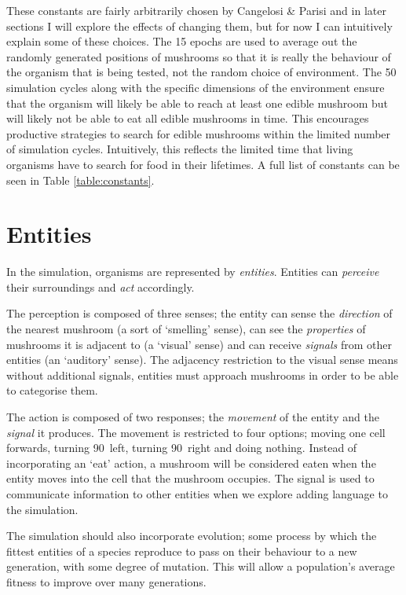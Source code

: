 \documentclass[12pt,a4paper,twoside,openright]{report}
\begin{document}
These constants are fairly arbitrarily chosen by Cangelosi \& Parisi and in later sections I will explore the effects of changing them, but for now I can intuitively explain some of these choices. The 15 epochs are used to average out the randomly generated positions of mushrooms so that it is really the behaviour of the organism that is being tested, not the random choice of environment. The 50 simulation cycles along with the specific dimensions of the environment ensure that the organism will likely be able to reach at least one edible mushroom but will likely not be able to eat all edible mushrooms in time. This encourages productive strategies to search for edible mushrooms within the limited number of simulation cycles. Intuitively, this reflects the limited time that living organisms have to search for food in their lifetimes. A full list of constants can be seen in Table \ref{table:constants}.

\section{Entities}\label{section:entities}

In the simulation, organisms are represented by \emph{entities}. Entities can \emph{perceive} their surroundings and \emph{act} accordingly.

The perception is composed of three senses; the entity can sense the \emph{direction} of the nearest mushroom (a sort of `smelling' sense), can see the \emph{properties} of mushrooms it is adjacent to (a `visual' sense) and can receive \emph{signals} from other entities (an `auditory' sense). The adjacency restriction to the visual sense means without additional signals, entities must approach mushrooms in order to be able to categorise them.

The action is composed of two responses; the \emph{movement} of the entity and the \emph{signal} it produces. The movement is restricted to four options; moving one cell forwards, turning 90\textdegree~left, turning 90\textdegree~right and doing nothing. Instead of incorporating an `eat' action, a mushroom will be considered eaten when the entity moves into the cell that the mushroom occupies. The signal is used to communicate information to other entities when we explore adding language to the simulation.

The simulation should also incorporate evolution; some process by which the fittest entities of a species reproduce to pass on their behaviour to a new generation, with some degree of mutation. This will allow a population's average fitness to improve over many generations.
\end{document}
